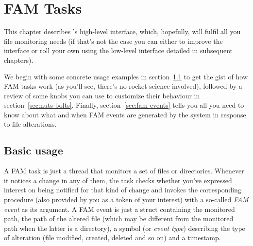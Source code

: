 
\chapter{FAM Tasks}
\label{cha:fam-tasks}

This chapter describes \MzFam's high-level interface, which,
hopefully, will fulfil all you file monitoring needs (if that's not
the case you can either  to improve the
interface or roll your own using the low-level interface detailed in
subsequent chapters).

We begin with some concrete usage examples in
section~\ref{sec:basic-usage} to get the gist of how FAM tasks work
(as you'll see, there's no rocket science involved), followed by a
review of some knobs you can use to customize their behaviour in
section~\ref{sec:nuts-bolts}. Finally, section~\ref{sec:fam-events}
tells you all you need to know about what and when FAM events are
generated by the system in response to file alterations.

\section{Basic usage}
\label{sec:basic-usage}

A FAM task is just a thread that monitors a set of files or
directories. Whenever it notices a change in any of them, the task
checks whether you've expressed interest on being notified for that
kind of change and invokes the corresponding procedure (also provided
by you as a token of your interest) with a so-called \textit{FAM
  event} as its argument. A FAM event is just a struct containing the
monitored path, the path of the altered file (which may be different
from the monitored path when the latter is a directory), a symbol (or
\textit{event type}) describing the type of alteration (file modified,
created, deleted and so on) and a timestamp.


